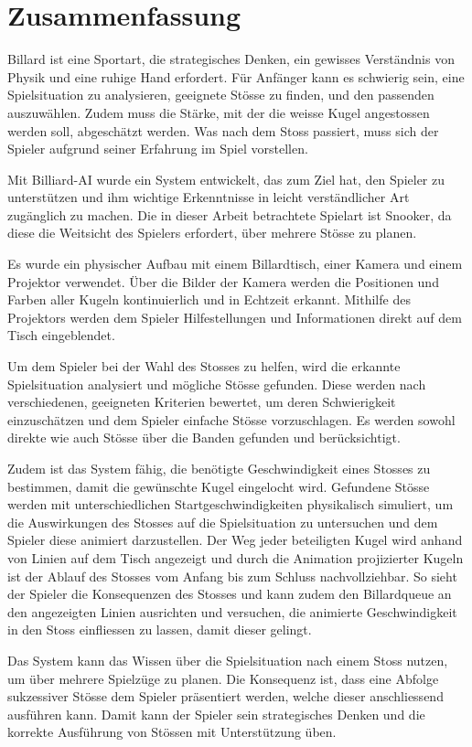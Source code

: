 \chapter{Zusammenfassung}
Billard ist eine Sportart, die strategisches Denken, ein gewisses Verständnis von Physik und eine ruhige Hand erfordert.
Für Anfänger kann es schwierig sein, eine Spielsituation zu analysieren, geeignete Stösse zu finden, und den passenden auszuwählen.
Zudem muss die Stärke, mit der die weisse Kugel angestossen werden soll, abgeschätzt werden.
Was nach dem Stoss passiert, muss sich der Spieler aufgrund seiner Erfahrung im Spiel vorstellen.

Mit Billiard-AI wurde ein System entwickelt, das zum Ziel hat, den Spieler zu unterstützen und ihm wichtige Erkenntnisse
in leicht verständlicher Art zugänglich zu machen.
Die in dieser Arbeit betrachtete Spielart ist Snooker, da diese die Weitsicht des Spielers erfordert, über mehrere Stösse zu planen.

Es wurde ein physischer Aufbau mit einem Billardtisch, einer Kamera und einem Projektor verwendet.
Über die Bilder der Kamera werden die Positionen und Farben aller Kugeln kontinuierlich und in Echtzeit erkannt.
Mithilfe des Projektors werden dem Spieler Hilfestellungen und Informationen direkt auf dem Tisch eingeblendet.

Um dem Spieler bei der Wahl des Stosses zu helfen, wird die erkannte Spielsituation analysiert und mögliche Stösse gefunden.
Diese werden nach verschiedenen, geeigneten Kriterien bewertet, um deren Schwierigkeit einzuschätzen und dem Spieler
einfache Stösse vorzuschlagen.
Es werden sowohl direkte wie auch Stösse über die Banden gefunden und berücksichtigt.

Zudem ist das System fähig, die benötigte Geschwindigkeit eines Stosses zu bestimmen, damit die gewünschte Kugel eingelocht wird.
Gefundene Stösse werden mit unterschiedlichen Startgeschwindigkeiten physikalisch simuliert, um die Auswirkungen
des Stosses auf die Spielsituation zu untersuchen und dem Spieler diese animiert darzustellen.
Der Weg jeder beteiligten Kugel wird anhand von Linien auf dem Tisch angezeigt und durch die Animation projizierter Kugeln
ist der Ablauf des Stosses vom Anfang bis zum Schluss nachvollziehbar.
So sieht der Spieler die Konsequenzen des Stosses und kann zudem den Billardqueue an den angezeigten Linien ausrichten
und versuchen, die animierte Geschwindigkeit in den Stoss einfliessen zu lassen, damit dieser gelingt.

Das System kann das Wissen über die Spielsituation nach einem Stoss nutzen, um über mehrere Spielzüge zu planen.
Die Konsequenz ist, dass eine Abfolge sukzessiver Stösse dem Spieler präsentiert werden, welche dieser anschliessend
ausführen kann.
Damit kann der Spieler sein strategisches Denken und die korrekte Ausführung von Stössen mit Unterstützung üben.

